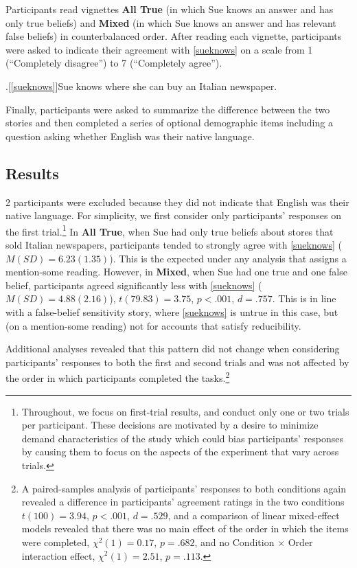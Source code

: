\documentclass[a4paper]{article}
\begin{document}
Participants read vignettes \textbf{All True} (in which Sue knows an answer and has only true beliefs) and \textbf{Mixed} (in which Sue knows an answer and has relevant false beliefs) in counterbalanced order. After reading each vignette, participants were asked to indicate their agreement with \ref{sueknows} on a scale from 1 (``Completely disagree'') to 7 (``Completely agree'').

\ex.[\ref{sueknows}]Sue knows where she can buy an Italian newspaper.

Finally, participants were asked to summarize the difference between the two stories and then completed a series of optional demographic items including a question asking whether English was their native language. 

\subsection{Results}

2 participants were excluded because they did not indicate that English was their native language. For simplicity, we first consider only participants' responses on the first trial.\footnote{Throughout, we focus on first-trial results, and conduct only one or two trials per participant. These decisions are motivated by a desire to minimize demand characteristics of the study which could bias participants' responses by causing them to focus on the aspects of the experiment that vary across trials.} In \textbf{All True}, when Sue had only true beliefs about stores that sold Italian newspapers, participants tended to strongly agree with \ref{sueknows} ($M(SD) = 6.23(1.35)$). This is the expected under any analysis that assigns a mention-some reading. However, in \textbf{Mixed}, when Sue had one true and one false belief, participants agreed significantly less with \ref{sueknows} ($M(SD) = 4.88(2.16)$), $t(79.83) = 3.75$, $p < .001$, $d = .757$. This is in line with a false-belief sensitivity story, where \ref{sueknows} is untrue in this case, but (on a mention-some reading) not for accounts that satisfy reducibility.

Additional analyses revealed that this pattern did not change when considering participants' responses to both the first and second trials and was not affected by the order in which participants completed the tasks.\footnote{A paired-samples analysis of participants' responses to both conditions again revealed a difference in participants' agreement ratings in the two conditions $t(100) = 3.94$,  $p < .001$, $d = .529$, and a comparison of linear mixed-effect models \citep{bates2012lme4,jaeger2008categorical,gelman2006data} revealed that there was no main effect of the order in which the items were completed, $\chi^2(1) = 0.17$, $p = .682$, and no Condition $\times$ Order interaction effect, $\chi^2(1) = 2.51$, $p = .113$.}
\end{document}
